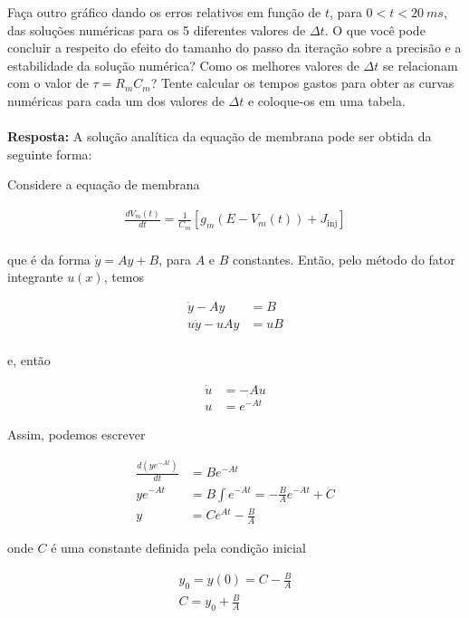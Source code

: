 \documentclass[portuguese,12pt,a4paper]{article}
\begin{document}
	Faça outro gráfico dando os erros relativos em função de $t$, para $0 < t < 20~ms$, das soluções numéricas para os 5 diferentes valores de $\Delta t$. O que você pode concluir a respeito do efeito do tamanho do passo da iteração sobre a precisão e a estabilidade da solução numérica? Como os melhores valores de $\Delta t$ se relacionam com o valor de $\tau = R_m C_m$? Tente calcular os tempos gastos para obter as curvas numéricas para cada um dos valores de $\Delta t$ e coloque-os em uma tabela.\\\\
	
	\noindent\textbf{Resposta:} A solução analítica da equação de membrana pode ser obtida da seguinte forma:
	
	Considere a equação de membrana
	
	\begin{align*}
		\frac{dV_m(t)}{dt} = \frac{1}{C_m}\left[g_m(E - V_m(t)) + J_{\text{inj}}\right] \\
	\end{align*}
	
	que é da forma $\dot{y} = Ay + B$, para $A$ e $B$ constantes. Então, pelo método do fator integrante $u(x)$, temos
	
	\begin{align*}
		\dot{y} - Ay &= B \\
		u\dot{y} - uAy &= uB \\
	\end{align*}
	
	e, então
	
	\begin{align*}
		\dot{u} &= -Au \\
		u &= e^{-At}
	\end{align*}
	
	Assim, podemos escrever
	
	\begin{align*}
		\frac{d(ye^{-At})}{dt} &= Be^{-At}\\ 
		ye^{-At} &= B\int e^{-At} = -\frac{B}{A}e^{-At} + C \\
		y &= Ce^{At} - \frac{B}{A}				
	\end{align*}
	
	onde $C$ é uma constante definida pela condição inicial
	
	\begin{align*}
		y_0 = y(0) = C - \frac{B}{A}\\
		C = y_0 + \frac{B}{A}
	\end{align*}
	
\end{document}
